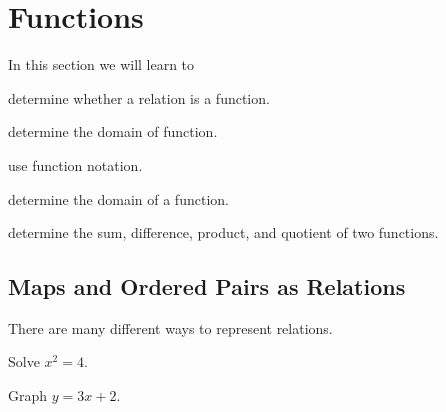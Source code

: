 \documentclass{book}
\begin{document}

\section{Functions}


\begin{objectives}{In this section we will learn to}
  \item
    determine whether a relation is a function.
  \item
    determine the domain of function.
  \item
    use function notation.
  \item
    determine the domain of a function.
  \item
    determine the sum, difference, product, and quotient of two functions.
\end{objectives}





\subsection{Maps and Ordered Pairs as Relations}
There are many different ways to represent relations.

\example
Solve $x^2=4$.
\vfill



\example
Graph $y = 3x+2$.
\vfill



\end{document}
